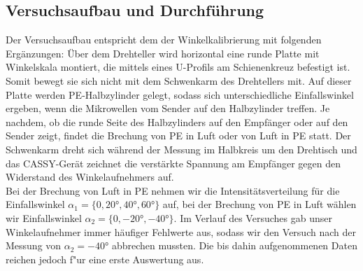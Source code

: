 \documentclass[12pt,a4paper]{article}
\begin{document}
\subsection{Versuchsaufbau und Durchführung}
Der Versuchsaufbau entspricht dem der Winkelkalibrierung mit folgenden Ergänzungen: Über dem Drehteller wird horizontal eine runde Platte mit Winkelskala montiert, die mittels eines U-Profils am Schienenkreuz befestigt ist. Somit bewegt sie sich nicht mit dem Schwenkarm des Drehtellers mit. Auf dieser Platte werden PE-Halbzylinder gelegt, sodass sich unterschiedliche Einfallswinkel ergeben, wenn die Mikrowellen vom Sender auf den Halbzylinder treffen. Je nachdem, ob die runde Seite des Halbzylinders auf den Empfänger oder auf den Sender zeigt, findet die Brechung von PE in Luft oder von Luft in PE statt. Der Schwenkarm dreht sich während der Messung im Halbkreis um den Drehtisch und das CASSY-Gerät zeichnet die verstärkte Spannung am Empfänger gegen den Widerstand des Winkelaufnehmers auf.\\
Bei der Brechung von Luft in PE nehmen wir die Intensitätsverteilung für die Einfallswinkel $\alpha_1=\{0,\ang{20},\ang{40},\ang{60}\}$ auf, bei der Brechung von PE in Luft wählen wir Einfallswinkel $\alpha_2=\{0,\ang{-20},\ang{-40}\}$. Im Verlauf des Versuches gab unser Winkelaufnehmer immer häufiger Fehlwerte aus, sodass wir den Versuch nach der Messung von $\alpha_2=\ang{-40}$ abbrechen mussten. Die bis dahin aufgenommenen Daten reichen jedoch f"ur eine erste Auswertung aus.
\end{document}
